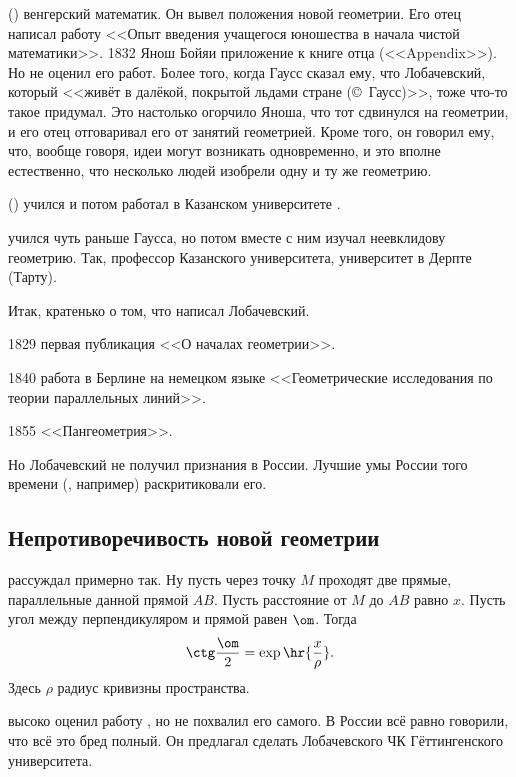 \documentclass[a4paper,oneside,fleqn,10pt]{article}
\begin{document}
 ()
венгерский математик.  Он вывел положения новой геометрии. Его отец
 написал работу
<<Опыт введения учащегося юношества в начала чистой математики>>.
1832 Янош Бойяи приложение к книге отца (<<Appendix>>). Но
 не оценил его работ.  Более того, когда Гаусс сказал ему,
что Лобачевский, который <<живёт в далёкой, покрытой льдами стране
(\copyright~Гаусс)>>, тоже что-то такое придумал.  Это настолько
огорчило Яноша, что тот сдвинулся на геометрии, и его отец отговаривал
его от занятий геометрией. Кроме того, он говорил ему, что, вообще
говоря, идеи могут возникать одновременно, и это вполне естественно,
что несколько людей изобрели одну и ту же геометрию.

() учился и потом работал в Казанском университете
.

  учился чуть раньше Гаусса, но потом
вместе с ним изучал неевклидову геометрию. Так, 
профессор Казанского университета,  университет в
Дерпте (Тарту).

Итак, кратенько о том, что написал Лобачевский.

1829 первая публикация <<О началах геометрии>>.

1840 работа в Берлине на немецком языке <<Геометрические исследования
по теории параллельных линий>>.

1855 <<Пангеометрия>>.

Но Лобачевский не получил признания в России.  Лучшие умы России того
времени (, например) раскритиковали его.

\subsection{Непротиворечивость новой геометрии}

 рассуждал примерно так.  Ну пусть через точку $M$
проходят две прямые, параллельные данной прямой $AB$. Пусть расстояние
от $M$ до $AB$ равно $x$.  Пусть угол между перпендикуляром и прямой
равен $\om$.  Тогда
$$\ctg \frac{\om}{2} = \exp\hr{\frac{x}{\rho}}.$$ Здесь $\rho$ радиус
кривизны пространства.

 высоко оценил работу ,
но не похвалил его самого.  В России всё равно говорили, что всё это
бред полный.  Он предлагал сделать Лобачевского ЧК Гёттингенского
университета.
\end{document}

